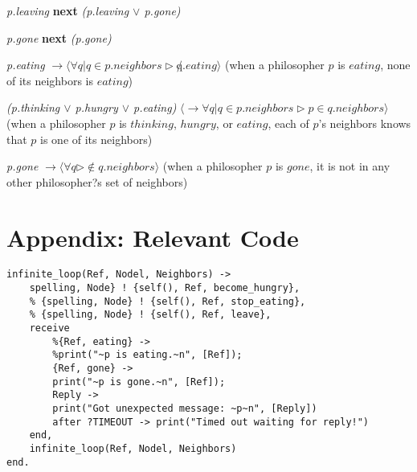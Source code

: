 \documentclass[11pt]{article}
\begin{document}
\indent

{\it p.leaving} {\bfseries next} {\it (p.leaving $\vee$ p.gone)}

\indent

{\it p.gone} {\bfseries next} {\it (p.gone)}

\indent

{\it p.eating} $\rightarrow \langle \forall q | q \in p.neighbors \rhd \not q.eating \rangle$
(when a philosopher $p$ is $eating$, none of its neighbors is $eating$)

\indent 

{\it (p.thinking $\vee$ p.hungry $\vee$ p.eating)} $\langle \rightarrow \forall q | q \in p.neighbors \rhd p \in q.neighbors \rangle$
(when a philosopher $p$ is $thinking$, $hungry$, or $eating$, each of $p$'s neighbors knows that $p$ is one of its neighbors)

\indent

{\it p.gone} $\rightarrow \langle \forall q  \rhd \not\in q.neighbors \rangle$
(when a philosopher $p$ is $gone$, it is not in any other philosopher?s set of neighbors)

\indent


\section{Appendix: Relevant Code}

\begin{lstlisting}
infinite_loop(Ref, Nodel, Neighbors) ->
    spelling, Node} ! {self(), Ref, become_hungry},
    % {spelling, Node} ! {self(), Ref, stop_eating},
    % {spelling, Node} ! {self(), Ref, leave},
    receive
        %{Ref, eating} ->          
        %print("~p is eating.~n", [Ref]);
        {Ref, gone} ->
        print("~p is gone.~n", [Ref]);
        Reply ->
        print("Got unexpected message: ~p~n", [Reply])
        after ?TIMEOUT -> print("Timed out waiting for reply!")
    end,
    infinite_loop(Ref, Nodel, Neighbors)
end.
\end{lstlisting}
\end{document}

